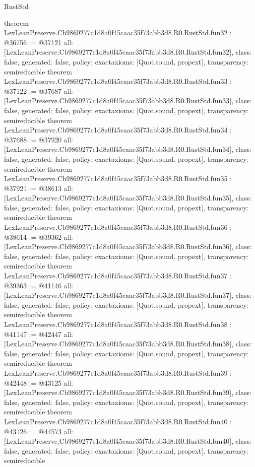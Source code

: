 \begin{lexlean}{RustStd}
\begin{coremodule}
{}
theorem LexLeanPreserve.Cb9869277c1d8a0f45caac35f73abb3d8.R0.RustStd.fun32 : @36756 := @37121 {
  all: [LexLeanPreserve.Cb9869277c1d8a0f45caac35f73abb3d8.R0.RustStd.fun32],
  class: false,
  generated: false,
  policy: exact{axioms: [Quot.sound, propext]},
  transparency: semireducible
}
theorem LexLeanPreserve.Cb9869277c1d8a0f45caac35f73abb3d8.R0.RustStd.fun33 : @37122 := @37687 {
  all: [LexLeanPreserve.Cb9869277c1d8a0f45caac35f73abb3d8.R0.RustStd.fun33],
  class: false,
  generated: false,
  policy: exact{axioms: [Quot.sound, propext]},
  transparency: semireducible
}
theorem LexLeanPreserve.Cb9869277c1d8a0f45caac35f73abb3d8.R0.RustStd.fun34 : @37688 := @37920 {
  all: [LexLeanPreserve.Cb9869277c1d8a0f45caac35f73abb3d8.R0.RustStd.fun34],
  class: false,
  generated: false,
  policy: exact{axioms: [Quot.sound, propext]},
  transparency: semireducible
}
theorem LexLeanPreserve.Cb9869277c1d8a0f45caac35f73abb3d8.R0.RustStd.fun35 : @37921 := @38613 {
  all: [LexLeanPreserve.Cb9869277c1d8a0f45caac35f73abb3d8.R0.RustStd.fun35],
  class: false,
  generated: false,
  policy: exact{axioms: [Quot.sound, propext]},
  transparency: semireducible
}
theorem LexLeanPreserve.Cb9869277c1d8a0f45caac35f73abb3d8.R0.RustStd.fun36 : @38614 := @39362 {
  all: [LexLeanPreserve.Cb9869277c1d8a0f45caac35f73abb3d8.R0.RustStd.fun36],
  class: false,
  generated: false,
  policy: exact{axioms: [Quot.sound, propext]},
  transparency: semireducible
}
theorem LexLeanPreserve.Cb9869277c1d8a0f45caac35f73abb3d8.R0.RustStd.fun37 : @39363 := @41146 {
  all: [LexLeanPreserve.Cb9869277c1d8a0f45caac35f73abb3d8.R0.RustStd.fun37],
  class: false,
  generated: false,
  policy: exact{axioms: [Quot.sound, propext]},
  transparency: semireducible
}
theorem LexLeanPreserve.Cb9869277c1d8a0f45caac35f73abb3d8.R0.RustStd.fun38 : @41147 := @42447 {
  all: [LexLeanPreserve.Cb9869277c1d8a0f45caac35f73abb3d8.R0.RustStd.fun38],
  class: false,
  generated: false,
  policy: exact{axioms: [Quot.sound, propext]},
  transparency: semireducible
}
theorem LexLeanPreserve.Cb9869277c1d8a0f45caac35f73abb3d8.R0.RustStd.fun39 : @42448 := @43125 {
  all: [LexLeanPreserve.Cb9869277c1d8a0f45caac35f73abb3d8.R0.RustStd.fun39],
  class: false,
  generated: false,
  policy: exact{axioms: [Quot.sound, propext]},
  transparency: semireducible
}
theorem LexLeanPreserve.Cb9869277c1d8a0f45caac35f73abb3d8.R0.RustStd.fun40 : @43126 := @44573 {
  all: [LexLeanPreserve.Cb9869277c1d8a0f45caac35f73abb3d8.R0.RustStd.fun40],
  class: false,
  generated: false,
  policy: exact{axioms: [Quot.sound, propext]},
  transparency: semireducible
}
\end{coremodule}
\end{lexlean}
